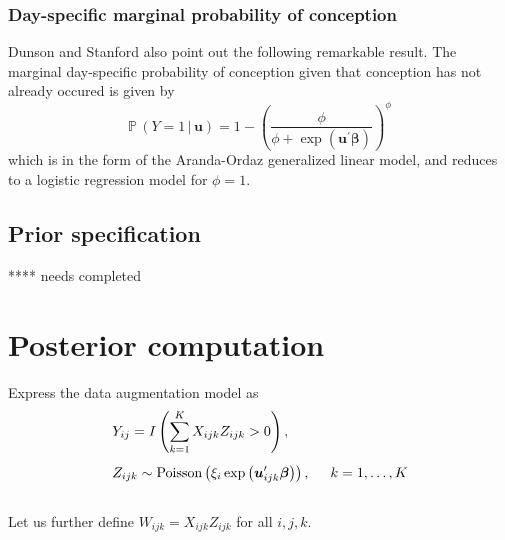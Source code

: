 \documentclass[11pt]{article}
\newcommand{\prob}{\mathbb{P}\,}
\renewcommand{\vec}{\boldsymbol}
\newcommand{\barS}{\,|\,}
\newcommand{\ind}{I}
\begin{document}

\subsubsection{Day-specific marginal probability of conception}
Dunson and Stanford also point out the following remarkable result.  The marginal day-specific probability of conception given that conception has not already occured is given by
\[ \prob( Y = 1 \barS \vec{u} ) = 1 - \left( \frac{ \phi }{ \phi + \exp(\vec{u}^\prime \vec{\beta}) } \right)^\phi \]
which is in the form of the Aranda-Ordaz generalized linear model, and reduces to a logistic regression model for $\phi = 1$.







\subsection{Prior specification}

****  needs completed





\vspace{2.54cm} \section{Posterior computation}

Express the data augmentation model as
\begin{align} \label{eq: Data augmentation model}
& Y_{ij} = \ind \left( \sum_{k=1}^K X_{ijk} Z_{ijk} > 0 \right), \nonumber \\[1ex]
& Z_{ijk} \sim \text{Poisson}\left( \xi_i \exp\left( \vec{u}_{ijk}^\prime \vec{\beta} \right)\right), \hspace{5mm}  k=1,\dots,K
\end{align} \\
Let us further define $W_{ijk} = X_{ijk} Z_{ijk}$ for all $i,j,k$.
\end{document}
